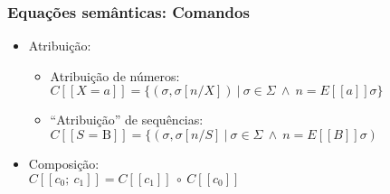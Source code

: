 \documentclass{beamer}
\begin{document}
\begin{frame}[fragile]
\frametitle{Equa\c c\~oes sem\^anticas: Comandos}
  \begin{itemize}
  \item Atribui\c c\~ao:
    \begin{itemize}
    \item Atribui\c c\~ao de n\'umeros:\\
      $C[[X = a]] = \{(\sigma, \sigma[n / X])\ |\ \sigma \in \Sigma\
      \wedge\ n = E[[a]]\sigma\}$

    \item ``Atribui\c c\~ao'' de sequ\^encias:\\
      $C[[S \mbox{ = B}]] = \{(\sigma, \sigma[n / S]\ |\ \sigma \in \Sigma\
      \wedge\ n = E[[B]]\sigma)$
    \end{itemize}
  \item Composi\c c\~ao:\\
    $C[[c_0;\ c_1]] = C[[c_1]]\ \circ\ C[[c_0]]$
  \end{itemize}
\end{frame}
\end{document}
